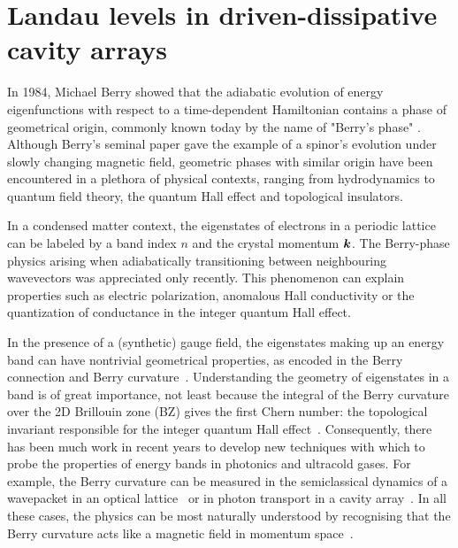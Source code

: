 

\chapter{Landau levels in driven-dissipative cavity arrays}
\label{cha:landau}

In 1984, Michael Berry showed that the adiabatic evolution of energy
eigenfunctions with respect to a time-dependent Hamiltonian contains a
phase of geometrical origin, commonly known today by the name of
"Berry's phase" \cite{Berry_1984}.  Although Berry's seminal paper gave
the example of a spinor's evolution under slowly changing magnetic
field, geometric phases \cite{shapere1989geometric} with similar
origin have been encountered in a plethora of physical contexts,
ranging from hydrodynamics to quantum field theory, the quantum Hall
effect and topological insulators.

In a condensed matter context, the eigenstates of electrons in a
periodic lattice can be labeled by a band index $n$ and the crystal
momentum $\bm{k}$. The Berry-phase physics arising when adiabatically
transitioning between neighbouring wavevectors was appreciated only
recently. This phenomenon can explain properties such as electric
polarization, anomalous Hall conductivity or the quantization of
conductance in the integer quantum Hall effect.

In the presence of a (synthetic) gauge field, the eigenstates making
up an energy band can have nontrivial geometrical properties, as
encoded in the Berry connection and Berry curvature~\cite{berry,
  xiao2010berryreview}. Understanding the geometry of eigenstates in a
band is of great importance, not least because the integral of the
Berry curvature over the 2D Brillouin zone (BZ) gives the first Chern
number: the topological invariant responsible for the integer quantum
Hall effect~\cite{thouless}. Consequently, there has been much work in
recent years to develop new techniques with which to probe the
properties of energy bands in photonics and ultracold gases. For
example, the Berry curvature can be measured in the semiclassical
dynamics of a wavepacket in an optical lattice~\cite{dudarev,1chang,
  price, cominotti, dauphin, aidelsburger2015measuring,
  jotzu2014experimental} or in photon transport in a cavity
array~\cite{ozawa2014qhe}. In all these cases, the physics can be most
naturally understood by recognising that the Berry curvature acts like
a magnetic field in momentum space~\cite{berry, bliokh2005spin,
  PhysRevD.12.3845, cooper2012designing}.

